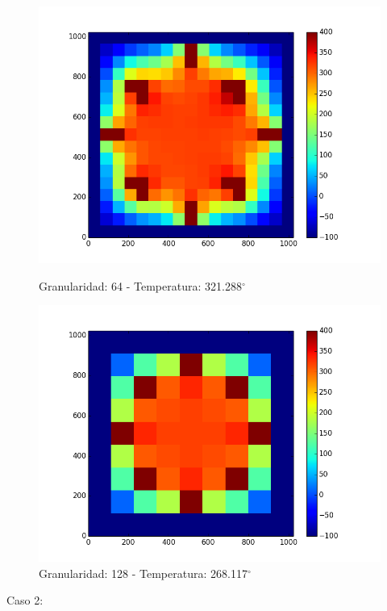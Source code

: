 \begin{figure}[htb]
\begin{center}
\includegraphics[scale=0.3]{imagenes/caso1_64.png} 
\caption{Granularidad: 64 - Temperatura: 321.288$^{\circ}$} 
        \end{center}
\endminipage\hfill
{}
\begin{center}
\includegraphics[scale=0.3]{imagenes/caso1_128.png} 
\caption{Granularidad: 128 - Temperatura: 268.117$^{\circ}$} 
        \end{center}
\endminipage\hfill 
\end{figure}
\newpage 
Caso 2:

